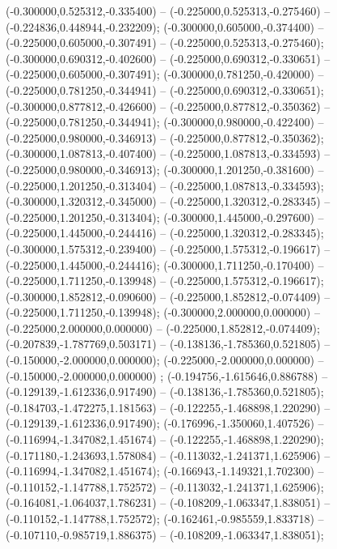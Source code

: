  (-0.300000,0.525312,-0.335400) -- (-0.225000,0.525313,-0.275460) -- (-0.224836,0.448944,-0.232209);
 (-0.300000,0.605000,-0.374400) -- (-0.225000,0.605000,-0.307491) -- (-0.225000,0.525313,-0.275460);
 (-0.300000,0.690312,-0.402600) -- (-0.225000,0.690312,-0.330651) -- (-0.225000,0.605000,-0.307491);
 (-0.300000,0.781250,-0.420000) -- (-0.225000,0.781250,-0.344941) -- (-0.225000,0.690312,-0.330651);
 (-0.300000,0.877812,-0.426600) -- (-0.225000,0.877812,-0.350362) -- (-0.225000,0.781250,-0.344941);
 (-0.300000,0.980000,-0.422400) -- (-0.225000,0.980000,-0.346913) -- (-0.225000,0.877812,-0.350362);
 (-0.300000,1.087813,-0.407400) -- (-0.225000,1.087813,-0.334593) -- (-0.225000,0.980000,-0.346913);
 (-0.300000,1.201250,-0.381600) -- (-0.225000,1.201250,-0.313404) -- (-0.225000,1.087813,-0.334593);
 (-0.300000,1.320312,-0.345000) -- (-0.225000,1.320312,-0.283345) -- (-0.225000,1.201250,-0.313404);
 (-0.300000,1.445000,-0.297600) -- (-0.225000,1.445000,-0.244416) -- (-0.225000,1.320312,-0.283345);
 (-0.300000,1.575312,-0.239400) -- (-0.225000,1.575312,-0.196617) -- (-0.225000,1.445000,-0.244416);
 (-0.300000,1.711250,-0.170400) -- (-0.225000,1.711250,-0.139948) -- (-0.225000,1.575312,-0.196617);
 (-0.300000,1.852812,-0.090600) -- (-0.225000,1.852812,-0.074409) -- (-0.225000,1.711250,-0.139948);
 (-0.300000,2.000000,0.000000) -- (-0.225000,2.000000,0.000000) -- (-0.225000,1.852812,-0.074409);
 (-0.207839,-1.787769,0.503171) -- (-0.138136,-1.785360,0.521805) -- (-0.150000,-2.000000,0.000000);
 (-0.225000,-2.000000,0.000000) -- (-0.150000,-2.000000,0.000000) ;
 (-0.194756,-1.615646,0.886788) -- (-0.129139,-1.612336,0.917490) -- (-0.138136,-1.785360,0.521805);
 (-0.184703,-1.472275,1.181563) -- (-0.122255,-1.468898,1.220290) -- (-0.129139,-1.612336,0.917490);
 (-0.176996,-1.350060,1.407526) -- (-0.116994,-1.347082,1.451674) -- (-0.122255,-1.468898,1.220290);
 (-0.171180,-1.243693,1.578084) -- (-0.113032,-1.241371,1.625906) -- (-0.116994,-1.347082,1.451674);
 (-0.166943,-1.149321,1.702300) -- (-0.110152,-1.147788,1.752572) -- (-0.113032,-1.241371,1.625906);
 (-0.164081,-1.064037,1.786231) -- (-0.108209,-1.063347,1.838051) -- (-0.110152,-1.147788,1.752572);
 (-0.162461,-0.985559,1.833718) -- (-0.107110,-0.985719,1.886375) -- (-0.108209,-1.063347,1.838051);
